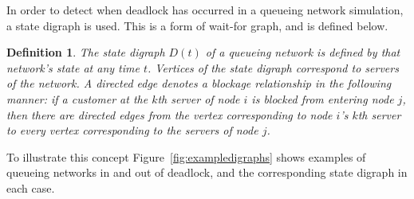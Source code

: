 \documentclass{article}
\newtheorem{definition}{Definition}
\numberwithin{equation}{section}
\begin{document}
In order to detect when deadlock has occurred in a queueing network simulation, a state digraph is used.
This is a form of wait-for graph, and is defined below.


\begin{definition}
The state digraph $D(t)$ of a queueing network is defined by that network's state at any time $t$.
Vertices of the state digraph correspond to servers of the network.
A directed edge denotes a blockage relationship in the following manner: if a customer at the $k$th server of node $i$ is blocked from entering node $j$, then there are directed edges from the vertex corresponding to node $i$'s $k$th server to every vertex corresponding to the servers of node $j$.
\end{definition}

To illustrate this concept Figure~\ref{fig:exampledigraphs} shows examples of queueing networks in and out of deadlock, and the corresponding state digraph in each case.
\end{document}
